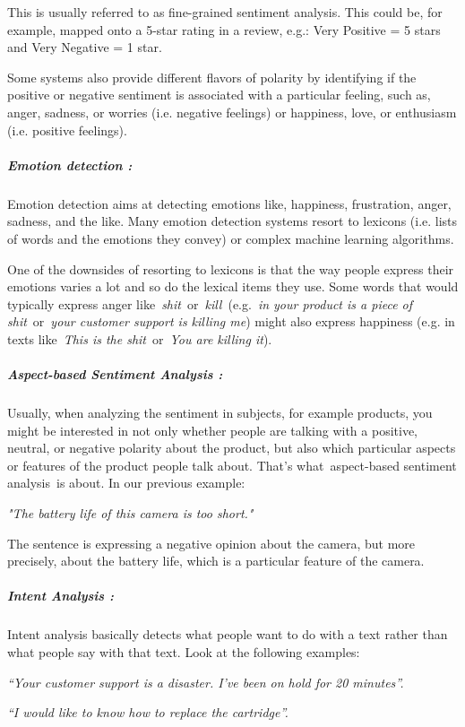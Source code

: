 \documentclass{article} %
\begin{document}
This is usually referred to as fine-grained sentiment analysis. This could be, for example, mapped onto a 5-star rating in a review, e.g.: Very Positive = 5 stars and Very Negative = 1 star.

\noindent Some systems also provide different flavors of polarity by identifying if the positive or negative sentiment is associated with a particular feeling, such as, anger, sadness, or worries (i.e. negative feelings) or happiness, love, or enthusiasm (i.e. positive feelings).


\subparagraph{ Emotion detection : }

Emotion detection aims at detecting emotions like, happiness, frustration, anger, sadness, and the like. Many emotion detection systems resort to lexicons (i.e. lists of words and the emotions they convey) or complex machine learning algorithms.

One of the downsides of resorting to lexicons is that the way people express their emotions varies a lot and so do the lexical items they use. Some words that would typically express anger like~\textit{shit}~or~\textit{kill}~(e.g.~\textit{in your product is a piece of shit}~or~\textit{your customer support is killing me}) might also express happiness (e.g. in texts like~\textit{This is the shit}~or~\textit{You are killing it}).


\subparagraph{ Aspect-based Sentiment Analysis :}

Usually, when analyzing the sentiment in subjects, for example products, you might be interested in not only whether people are talking with a positive, neutral, or negative polarity about the product, but also which particular aspects or features of the product people talk about. That's what~aspect-based sentiment analysis~is about. In our previous example:

\noindent \textit{"The battery life of this camera is too short."}

The sentence is expressing a negative opinion about the camera, but more precisely, about the battery life, which is a particular feature of the camera.


\subparagraph{ Intent Analysis :}

Intent analysis basically detects what people want to do with a text rather than what people say with that text. Look at the following examples:

\noindent \textit{``Your customer support is a disaster. I've been on hold for 20 minutes''.}

\noindent \textit{``I would like to know how to replace the cartridge''.}
\end{document}
